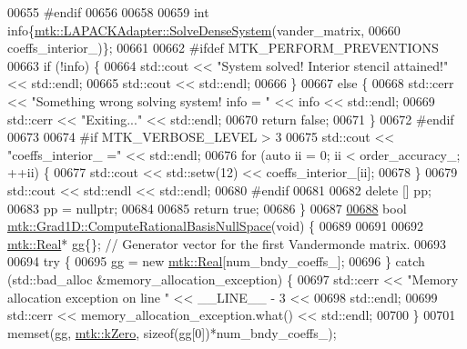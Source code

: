 \begin{DoxyCode}
{{00655 \textcolor{preprocessor}{  #endif}
00656 
00658 
00659   \textcolor{keywordtype}{int} info\{\hyperlink{classmtk_1_1LAPACKAdapter_a7428bccf74fd4a4af68fb7233846da22}{mtk::LAPACKAdapter::SolveDenseSystem}(vander\_matrix,
00660                                                 coeffs\_interior\_)\};
00661 
00662 \textcolor{preprocessor}{  #ifdef MTK\_PERFORM\_PREVENTIONS}
00663   \textcolor{keywordflow}{if} (!info) \{
00664     std::cout << \textcolor{stringliteral}{"System solved! Interior stencil attained!"} << std::endl;
00665     std::cout << std::endl;
00666   \}
00667   \textcolor{keywordflow}{else} \{
00668     std::cerr << \textcolor{stringliteral}{"Something wrong solving system! info = "} << info << std::endl;
00669     std::cerr << \textcolor{stringliteral}{"Exiting..."} << std::endl;
00670     \textcolor{keywordflow}{return} \textcolor{keyword}{false};
00671   \}
00672 \textcolor{preprocessor}{  #endif}
00673 
00674 \textcolor{preprocessor}{  #if MTK\_VERBOSE\_LEVEL > 3}
00675   std::cout << \textcolor{stringliteral}{"coeffs\_interior\_ ="} << std::endl;
00676   \textcolor{keywordflow}{for} (\textcolor{keyword}{auto} ii = 0; ii < order\_accuracy\_; ++ii) \{
00677     std::cout << std::setw(12) << coeffs\_interior\_[ii];
00678   \}
00679   std::cout << std::endl << std::endl;
00680 \textcolor{preprocessor}{  #endif}
00681 
00682   \textcolor{keyword}{delete} [] pp;
00683   pp = \textcolor{keyword}{nullptr};
00684 
00685   \textcolor{keywordflow}{return} \textcolor{keyword}{true};
00686 \}
00687 
\hypertarget{mtk__grad__1d_8cc_source_l00688}{}\hyperlink{classmtk_1_1Grad1D_a2d03e6a3961bee558f575ec4099782a9}{00688} \textcolor{keywordtype}{bool} \hyperlink{classmtk_1_1Grad1D_a2d03e6a3961bee558f575ec4099782a9}{mtk::Grad1D::ComputeRationalBasisNullSpace}(\textcolor{keywordtype}{void}) \{
00689 
00691 
00692   \hyperlink{group__c01-roots_gac080bbbf5cbb5502c9f00405f894857d}{mtk::Real}* gg\{\}; \textcolor{comment}{// Generator vector for the first Vandermonde matrix.}
00693 
00694   \textcolor{keywordflow}{try} \{
00695     gg = \textcolor{keyword}{new} \hyperlink{group__c01-roots_gac080bbbf5cbb5502c9f00405f894857d}{mtk::Real}[num\_bndy\_coeffs\_];
00696   \} \textcolor{keywordflow}{catch} (std::bad\_alloc &memory\_allocation\_exception) \{
00697     std::cerr << \textcolor{stringliteral}{"Memory allocation exception on line "} << \_\_LINE\_\_ - 3 <<
00698       std::endl;
00699     std::cerr << memory\_allocation\_exception.what() << std::endl;
00700   \}
00701   memset(gg, \hyperlink{group__c01-roots_ga59a451a5fae30d59649bcda274fea271}{mtk::kZero}, \textcolor{keyword}{sizeof}(gg[0])*num\_bndy\_coeffs\_);
}}
\end{DoxyCode}
